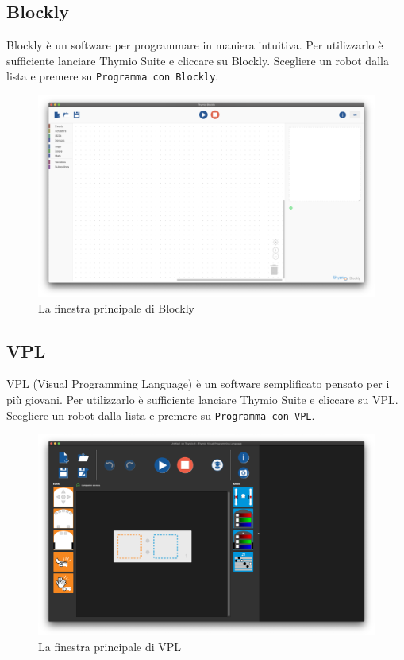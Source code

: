 \documentclass[12pt]{article}
\begin{document}
	\subsection{Blockly}

		Blockly è un software per programmare in maniera intuitiva. Per utilizzarlo è sufficiente lanciare Thymio Suite e cliccare su Blockly. Scegliere un robot dalla lista e premere su \texttt{Programma con Blockly}.
		
		\begin{figure}[H]
			\includegraphics[width=\textwidth]{img/blockly.png}
			\caption{La finestra principale di Blockly}
			\label{main_blockly}
		\end{figure}
		
	\subsection{VPL}
	
		VPL (Visual Programming Language) è un software semplificato pensato per i più giovani. Per utilizzarlo è sufficiente lanciare Thymio Suite e cliccare su VPL. Scegliere un robot dalla lista e premere su \texttt{Programma con VPL}.
		
		\begin{figure}[H]
			\includegraphics[width=\textwidth]{img/vpl.png}
			\caption{La finestra principale di VPL}
			\label{main_vpl}
		\end{figure}
		
\end{document}
